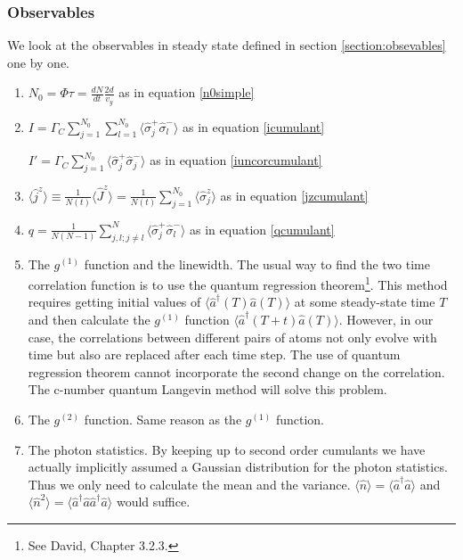 \documentclass{article}
\newcommand{\gc}{\Gamma_C}
\begin{document}
\subsubsection{Observables}
We look at the observables in steady state defined in section \ref{section:obsevables} one by one.
\begin{enumerate}
    \item $N_0 =\Phi\tau=\frac{dN}{dt}\frac{2d}{v_y}$ as in equation \ref{n0simple}
    \item $I = \gc\sum_{j=1}^{N_0}\sum_{l=1}^{N_0}\langle \hat{\sigma}_j^+\hat{\sigma}_l^-\rangle$ as in equation \ref{icumulant}
    
          $I'=\gc\sum_{j=1}^{N_0}\langle \hat{\sigma}_j^+\hat{\sigma}_j^-\rangle$ as in equation \ref{iuncorcumulant}
    \item $\langle\hat{j}^z\rangle\equiv\frac{1}{N(t)}\langle\hat{J}^z\rangle=\frac{1}{N(t)}\sum_{j=1}^{N_0}\langle\hat{\sigma}_j^z\rangle$ as in equation \ref{jzcumulant}
    \item $q=\frac{1}{N(N-1)}\sum_{j,l; j\neq l}^{N}\langle \hat{\sigma}_j^+\hat{\sigma}_l^-\rangle$ as in equation \ref{qcumulant}
    \item The $g^{(1)}$ function and the linewidth. The usual way to find the two time correlation function is to use the quantum regression theorem\footnote{See David, Chapter 3.2.3.}. This method requires getting initial values of $\langle \hat{a}^\dagger(T) \hat{a}(T) \rangle$ at some steady-state time $T$ and then calculate the $g^{(1)}$ function $\langle \hat{a}^\dagger(T+t) \hat{a}(T)\rangle$. However, in our case, the correlations between different pairs of atoms not only evolve with time but also are replaced after each time step. The use of quantum regression theorem cannot incorporate the second change on the correlation. The c-number quantum Langevin method will solve this problem.
    \item The $g^{(2)}$ function. Same reason as the $g^{(1)}$ function.
    \item The photon statistics. By keeping up to second order cumulants we have actually implicitly assumed a Gaussian distribution for the photon statistics. Thus we only need to calculate the mean and the variance. $\langle \hat{n}\rangle=\langle\hat{a}^\dagger \hat{a}\rangle$ and $\langle \hat{n}^2\rangle=\langle \hat{a}^\dagger\hat{a}\hat{a}^\dagger\hat{a}\rangle$ would suffice.
    
\end{enumerate}
\bigskip
\end{document}
